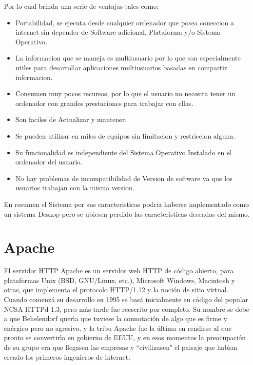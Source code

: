 Por lo cual brinda una serie de ventajas tales como:

\begin{itemize}
    \item Portabilidad, se ejecuta desde cualquier ordenador que posea coneccion a internet sin
        depender de Software adicional, Plataforma y/o Sistema Operativo.
    \item La informacion que se maneja es multiusuario por lo que son especialmente utiles para
        desarrollar aplicaciones multiusuarios basadas en compartir informacion.
    \item Consumen muy pocos recursos, por lo que el usuario no necesita tener un ordenador con 
        grandes prestaciones para trabajar con ellas.
    \item Son faciles de Actualizar y mantener.
    \item Se pueden utilizar en miles de equipos sin limitacion y restriccion alguna.
    \item Su funcionalidad es independiente del Sistema Operativo Instalado en el ordenador del 
            usuario.
    \item No hay problemas de incompatibilidad de Version de software ya que los usuarios trabajan 
        con la misma version.
\end{itemize}

En resumen el Sistema por sus caracteristicas podria haberse implementado como un sistema
Deskop pero se ubiesen perdido las caracteristicas deseadas del mismo.


\section{Apache}

El servidor HTTP Apache es un servidor web HTTP de c\'odigo abierto, para plataformas
Unix (BSD, GNU/Linux, etc.), Microsoft Windows, Macintosh y otras, que implementa
el protocolo HTTP/1.12 y la noci\'on de sitio virtual. Cuando comenz\'a su desarrollo en 
1995 se bas\'a inicialmente en c\'odigo del popular NCSA HTTPd 1.3, pero m\'as tarde fue 
reescrito por completo. Su nombre se debe a que Behelendorf quer\'{\i}a que tuviese la 
connotaci\'on de algo que es firme y en\'ergico pero no agresivo, y la tribu Apache fue
la \'ultima en rendirse al que pronto se convertir\'{\i}a en gobierno de EEUU, y en esos
momentos la preocupaci\'on de su grupo era que llegasen las empresas y ``civilizasen" 
el paisaje que hab\'{\i}an creado los primeros ingenieros de internet.\\[0.1cm]


